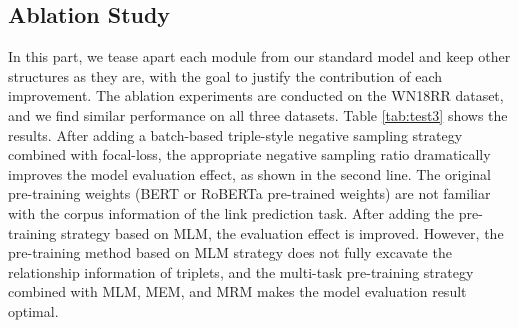 \documentclass[journal]{IEEEtran}
\begin{document}
\subsection{Ablation Study}

\begin{table*}[htbp]
\centering
\caption{\label{tab:test3} Ablation study for LP-BERT on the WN18RR dataset.}

\end{table*}

In this part, we tease apart each module from our standard model and keep other structures as they are, with the goal to justify the contribution of each improvement. The ablation experiments are conducted on the WN18RR dataset, and we find similar performance on all three datasets. Table \ref{tab:test3} shows the results.
After adding a batch-based triple-style negative sampling strategy combined with focal-loss, the appropriate negative sampling ratio dramatically improves the model evaluation effect, as shown in the second line. The original pre-training weights (BERT or RoBERTa pre-trained weights) are not familiar with the corpus information of the link prediction task. After adding the pre-training strategy based on MLM, the evaluation effect is improved. However, the pre-training method based on MLM strategy does not fully excavate the relationship information of triplets, and the multi-task pre-training strategy combined with MLM, MEM, and MRM makes the model evaluation result optimal.
\end{document}
